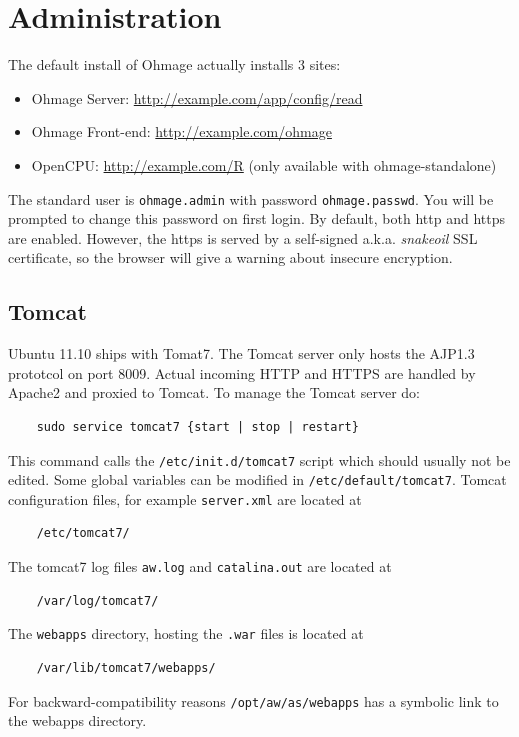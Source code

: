 \documentclass{scrartcl}
\begin{document}
\section{Administration}

The default install of Ohmage actually installs 3 sites:

\begin{itemize}
  \item Ohmage Server: \url{http://example.com/app/config/read}
  \item Ohmage Front-end: \url{http://example.com/ohmage}
  \item OpenCPU: \url{http://example.com/R} (only available with
  ohmage-standalone)
\end{itemize}
The standard user is \texttt{ohmage.admin} with password \texttt{ohmage.passwd}.
You will be prompted to change this password on first login.
By default, both http and https are enabled. However, the https is served by a
self-signed a.k.a. \emph{snakeoil} SSL certificate, so the browser will give a
warning about insecure encryption.

\subsection{Tomcat}

Ubuntu 11.10 ships with Tomat7. The Tomcat server only hosts the AJP1.3
prototcol on port 8009. Actual incoming HTTP and HTTPS are handled by Apache2
and proxied to Tomcat. To manage the Tomcat server do:

\begin{verbatim}
    sudo service tomcat7 {start | stop | restart}
\end{verbatim}
This command calls the \texttt{/etc/init.d/tomcat7} script which should usually
not be edited. Some global variables can be modified in
\texttt{/etc/default/tomcat7}. Tomcat configuration files, for example
\texttt{server.xml} are located at

\begin{verbatim}
    /etc/tomcat7/
\end{verbatim}
The tomcat7 log files \texttt{aw.log} and \texttt{catalina.out} are located
at

\begin{verbatim}
    /var/log/tomcat7/
\end{verbatim}
The \texttt{webapps} directory, hosting the \texttt{.war} files is located at

\begin{verbatim}
    /var/lib/tomcat7/webapps/
\end{verbatim}
For backward-compatibility reasons \texttt{/opt/aw/as/webapps} has a symbolic
link to the webapps directory.
\end{document}
